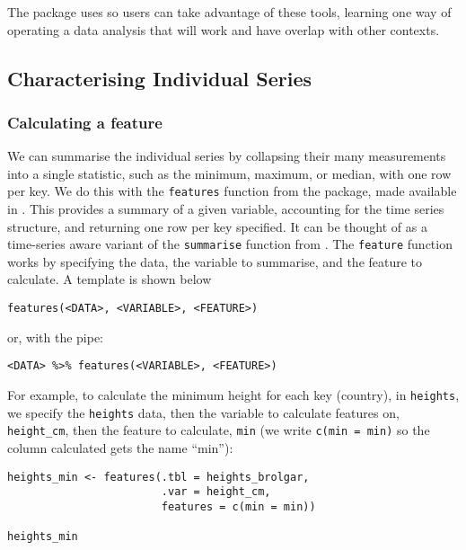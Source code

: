 The  package uses  so users can take advantage of these tools, learning one way of operating a data analysis that will work and have overlap with other contexts.

\hypertarget{characterising-individual-series}{%
\subsection{Characterising Individual Series}\label{characterising-individual-series}}

\hypertarget{calculating-a-feature}{%
\subsubsection{Calculating a feature}\label{calculating-a-feature}}

We can summarise the individual series by collapsing their many measurements into a single statistic, such as the minimum, maximum, or median, with one row per key. We do this with the \texttt{features} function from the  package, made available in . This provides a summary of a given variable, accounting for the time series structure, and returning one row per key specified. It can be thought of as a time-series aware variant of the \texttt{summarise} function from . The \texttt{feature} function works by specifying the data, the variable to summarise, and the feature to calculate. A template is shown below

\begin{verbatim}
features(<DATA>, <VARIABLE>, <FEATURE>)
\end{verbatim}

or, with the pipe:

\begin{verbatim}
<DATA> %>% features(<VARIABLE>, <FEATURE>)
\end{verbatim}

For example, to calculate the minimum height for each key (country), in \texttt{heights}, we specify the \texttt{heights} data, then the variable to calculate features on, \texttt{height\_cm}, then the feature to calculate, \texttt{min} (we write \texttt{c(min\ =\ min)} so the column calculated gets the name ``min''):

\begin{verbatim}
heights_min <- features(.tbl = heights_brolgar, 
                        .var = height_cm, 
                        features = c(min = min))

heights_min
\end{verbatim}

